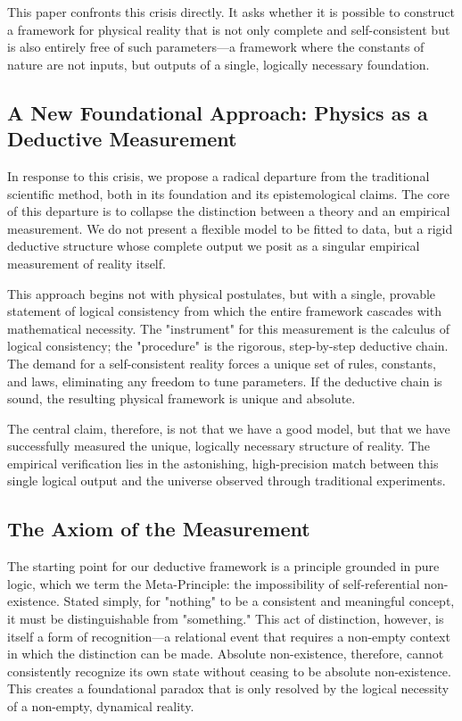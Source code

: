This paper confronts this crisis directly. It asks whether it is possible to construct a framework for physical reality that is not only complete and self-consistent but is also entirely free of such parameters—a framework where the constants of nature are not inputs, but outputs of a single, logically necessary foundation.

\subsection{A New Foundational Approach: Physics as a Deductive Measurement}
In response to this crisis, we propose a radical departure from the traditional scientific method, both in its foundation and its epistemological claims. The core of this departure is to collapse the distinction between a theory and an empirical measurement. We do not present a flexible model to be fitted to data, but a rigid deductive structure whose complete output we posit as a singular empirical measurement of reality itself.

This approach begins not with physical postulates, but with a single, provable statement of logical consistency from which the entire framework cascades with mathematical necessity. The "instrument" for this measurement is the calculus of logical consistency; the "procedure" is the rigorous, step-by-step deductive chain. The demand for a self-consistent reality forces a unique set of rules, constants, and laws, eliminating any freedom to tune parameters. If the deductive chain is sound, the resulting physical framework is unique and absolute.

The central claim, therefore, is not that we have a good model, but that we have successfully measured the unique, logically necessary structure of reality. The empirical verification lies in the astonishing, high-precision match between this single logical output and the universe observed through traditional experiments.

\subsection{The Axiom of the Measurement}
The starting point for our deductive framework is a principle grounded in pure logic, which we term the Meta-Principle: the impossibility of self-referential non-existence. Stated simply, for "nothing" to be a consistent and meaningful concept, it must be distinguishable from "something." This act of distinction, however, is itself a form of recognition—a relational event that requires a non-empty context in which the distinction can be made. Absolute non-existence, therefore, cannot consistently recognize its own state without ceasing to be absolute non-existence. This creates a foundational paradox that is only resolved by the logical necessity of a non-empty, dynamical reality.

